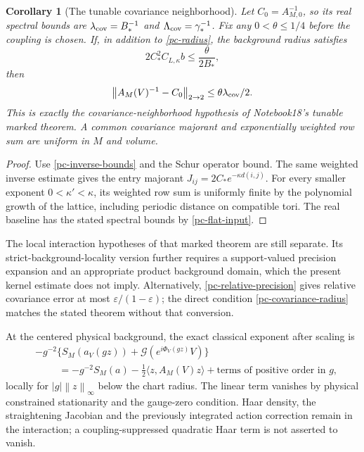 \documentclass[11pt]{article}
\newtheorem{corollary}[theorem]{Corollary}
\theoremstyle{remark}
\newcommand{\norm}[1]{\left\|#1\right\|}
\begin{document}
\begin{corollary}[The tunable covariance neighborhood]
\label{pc-tunable-covariance}
Let $C_0=A_{M,0}^{-1}$, so its real spectral bounds are
$\lambda_{\rm cov}=B_*^{-1}$ and
$\Lambda_{\rm cov}=\gamma_*^{-1}$. Fix any
$0<\theta\le1/4$ before the coupling is chosen. If, in addition
to \eqref{pc-radius}, the background radius satisfies
\begin{equation}\label{pc-covariance-radius}
 2C_*^2C_{L,\kappa}b\le\frac{\theta}{2B_*},
\end{equation}
then
\begin{equation}\label{pc-covariance-close}
 \norm{A_M(V)^{-1}-C_0}_{2\to2}
       \le\theta\lambda_{\rm cov}/2.
\end{equation}
This is exactly the covariance-neighborhood hypothesis of
Notebook18's tunable marked theorem. A common covariance
majorant and exponentially weighted row sum are uniform in
$M$ and volume.
\end{corollary}
\begin{proof}
Use \eqref{pc-inverse-bounds} and the Schur operator bound.
The same weighted inverse estimate gives the entry majorant
$J_{ij}=2C_*e^{-\kappa d(i,j)}$. For every smaller exponent
$0<\kappa'<\kappa$, its weighted row sum is uniformly finite
by the polynomial growth of the lattice, including periodic
distance on compatible tori. The real baseline has the stated
spectral bounds by \eqref{pc-flat-input}.
\end{proof}
The local interaction hypotheses of that marked theorem are
still separate. Its strict-background-locality version further
requires a support-valued precision expansion and an appropriate
product background domain, which the present kernel estimate
does not imply. Alternatively,
\eqref{pc-relative-precision} gives relative covariance error
at most $\varepsilon/(1-\varepsilon)$; the direct condition
\eqref{pc-covariance-radius} matches the stated theorem without
that conversion.

At the centered physical background, the exact classical
exponent after scaling is
\begin{equation}\label{pc-scaled-exponent}
 \begin{split}
 &-g^{-2}\{S_M(a_V(gz))+\mathcal G(e^{i\Phi_V(gz)}V)\}\\
 &\hspace{1cm}=-g^{-2}S_M(a)-\tfrac12\langle z,A_M(V)z\rangle
                  +\text{terms of positive order in }g,
 \end{split}
\end{equation}
locally for $|g|\norm z_\infty$ below the chart radius. The
linear term vanishes by physical constrained stationarity and
the gauge-zero condition. Haar density, the straightening
Jacobian and the previously integrated action correction
remain in the interaction; a coupling-suppressed quadratic
Haar term is not asserted to vanish.
\end{document}
